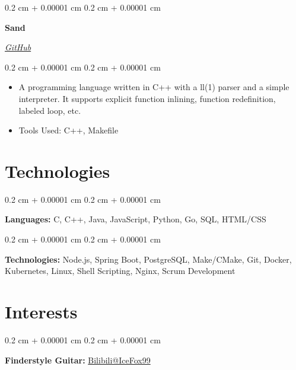 \documentclass[10pt, letterpaper]{article}
\newenvironment{highlights}{
    \begin{itemize}[
        topsep=0.10 cm,
        parsep=0.10 cm,
        partopsep=0pt,
        itemsep=0pt,
        leftmargin=0.4 cm + 10pt
    ]
}{
    \end{itemize}
} %
\newenvironment{onecolentry}{
    \begin{adjustwidth}{
        0.2 cm + 0.00001 cm
    }{
        0.2 cm + 0.00001 cm
    }
}{
    \end{adjustwidth}
} %
\newenvironment{twocolentry}[2][]{
    \onecolentry
    \def\secondColumn{#2}
    \setcolumnwidth{\fill, 4.5 cm}
    \begin{paracol}{2}
}{
    \switchcolumn \raggedleft \secondColumn
    \end{paracol}
    \endonecolentry
} %
\begin{document}
        \vspace{0.2 cm}

        \begin{twocolentry}{
            
            
        \textit{\href{https://github.com/IceFox99/Trashcan/tree/Sand}{GitHub}}}
            \textbf{Sand}
        \end{twocolentry}

        \vspace{0.10 cm}
        \begin{onecolentry}
            \begin{highlights}
                \item A programming language written in C++ with a ll(1) parser and a simple interpreter. It supports explicit function inlining, function redefinition, labeled loop, etc.
                \item Tools Used: C++, Makefile
            \end{highlights}
        \end{onecolentry}



    
    \section{Technologies}



        
        \begin{onecolentry}
            \textbf{Languages:} C, C++, Java, JavaScript, Python, Go, SQL, HTML/CSS
        \end{onecolentry}

        \vspace{0.2 cm}

        \begin{onecolentry}
            \textbf{Technologies:} Node.js, Spring Boot, PostgreSQL, Make/CMake, Git, Docker, Kubernetes, Linux, Shell Scripting, Nginx, Scrum Development
        \end{onecolentry}


    
    \section{Interests}



        
        \begin{onecolentry}
            \textbf{Finderstyle Guitar:} \href{https://space.bilibili.com/15718497}{Bilibili@IceFox99}
        \end{onecolentry}
\end{document}
